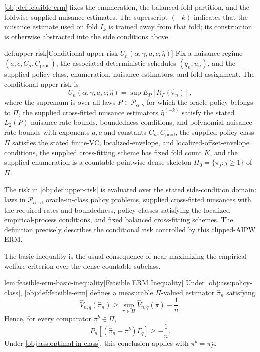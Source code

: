 \cref{obj:def:feasible-erm} fixes the enumeration, the balanced fold partition, and the foldwise supplied nuisance estimates.  The superscript \((-k)\) indicates that the nuisance estimate used on fold \(I_k\) is trained away from that fold; its construction is otherwise abstracted into the side conditions above.

\begin{definitionv}{def:upper-risk}[Conditional upper risk \(U_n(\alpha,\gamma,a,c;\widehat\eta)\)]
Fix a nuisance regime \((a,c,C_\mu,C_{\mathrm{prod}})\), the associated deterministic schedules \((q_n,u_n)\), and the supplied policy class, enumeration, nuisance estimators, and fold assignment. The conditional upper risk is
\[
U_n(\alpha,\gamma,a,c;\widehat\eta)
=
\sup E_P\!\left[R_P(\widehat\pi_n)\right],
\]
where the supremum is over all laws \(P\in\mathcal P_{\alpha,\gamma}\) for which the oracle policy belongs to \(\Pi\), the supplied cross-fitted nuisance estimators \(\widehat\eta^{(-k)}\) satisfy the stated \(L_2(P)\) nuisance-rate bounds, boundedness conditions, and polynomial nuisance-rate bounds with exponents \(a,c\) and constants \(C_\mu,C_{\mathrm{prod}}\), the supplied policy class \(\Pi\) satisfies the stated finite-VC, localized-envelope, and localized-offset-envelope conditions, the supplied cross-fitting scheme has fixed fold count \(K\), and the supplied enumeration is a countable pointwise-dense skeleton \(\Pi_0=\{\pi_j:j\ge1\}\) of \(\Pi\).
\end{definitionv}

The risk in \cref{obj:def:upper-risk} is evaluated over the stated side-condition domain: laws in \(\mathcal P_{\alpha,\gamma}\), oracle-in-class policy problems, supplied cross-fitted nuisances with the required rates and boundedness, policy classes satisfying the localized empirical-process conditions, and fixed balanced cross-fitting schemes.  The definition precisely describes the conditional risk controlled by this clipped-AIPW ERM.

The basic inequality is the usual consequence of near-maximizing the empirical welfare criterion over the dense countable subclass.

\begin{lemmav}{lem:feasible-erm-basic-inequality}[Feasible ERM Inequality]
Under \cref{obj:ass:policy-class}, \cref{obj:def:feasible-erm} defines a measurable \(\Pi\)-valued estimator \(\widehat\pi_n\) satisfying
\[
\widehat V_{n,q}(\widehat\pi_n)
\ge
\sup_{\pi\in\Pi}\widehat V_{n,q}(\pi)-\frac1n .
\]
Hence, for every comparator \(\pi^b\in\Pi\),
\[
P_n\!\left[(\widehat\pi_n-\pi^b)\Gamma_q\right]\ge -\frac1n .
\]
Under \cref{obj:ass:optimal-in-class}, this conclusion applies with \(\pi^b=\pi^\star_P\).
\end{lemmav}

